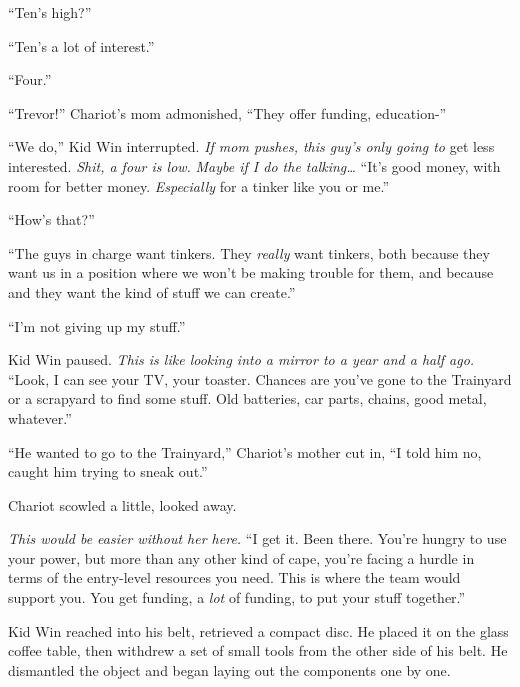 ``Ten's high?''



``Ten's a lot of interest.''



``Four.''



``Trevor!'' Chariot's mom admonished, ``They offer funding, education-''



``We do,'' Kid Win interrupted.  \emph{If mom pushes, this guy's only going to }get less interested.  \emph{Shit, a four is low.  }\emph{Maybe if I do the talking\ldots} ``It's good money, with room for better money.  \emph{Especially} for a tinker like you or me.''



``How's that?''



``The guys in charge want tinkers.  They \emph{really} want tinkers, both because they want us in a position where we won't be making trouble for them, and because and they want the kind of stuff we can create.''



``I'm not giving up my stuff.''



Kid Win paused.  \emph{This is like looking into a mirror to a year and a half ago.}  ``Look, I can see your TV, your toaster.  Chances are you've gone to the Trainyard or a scrapyard to find some stuff.  Old batteries, car parts, chains, good metal, whatever.''



``He wanted to go to the Trainyard,'' Chariot's mother cut in, ``I told him no, caught him trying to sneak out.''



Chariot scowled a little, looked away.



\emph{This would be easier without her here.}  ``I get it.  Been there.  You're hungry to use your power, but more than any other kind of cape, you're facing a hurdle in terms of the entry-level resources you need.  This is where the team would support you.  You get funding, a \emph{lot} of funding, to put your stuff together.''



Kid Win reached into his belt, retrieved a compact disc.  He placed it on the glass coffee table, then withdrew a set of small tools from the other side of his belt.  He dismantled the object and began laying out the components one by one.



